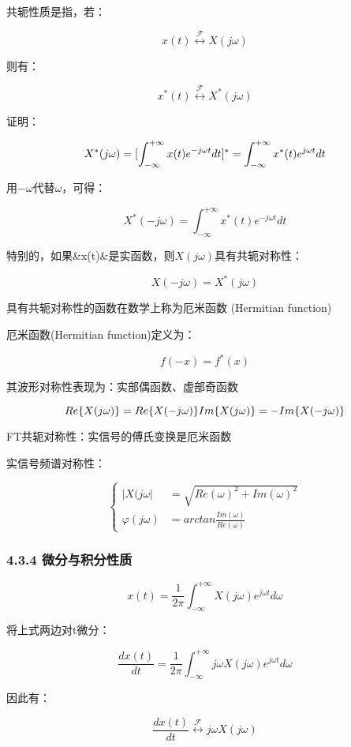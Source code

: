 \documentclass[
]{article}
\begin{document}
共轭性质是指，若：

\[x(t)\stackrel{\mathcal{F}}{\longleftrightarrow}X({j\omega})\]

则有：

\[x^*(t)\stackrel{\mathcal{F}}{\longleftrightarrow}X^*(j\omega)\]

证明：

\[X^*(j\omega) = [\int_{-\infty}^{+\infty}x(t)e^{-j\omega t}dt]^*\\
=\int_{-\infty}^{+\infty}x^*(t)e^{j\omega t}dt\]

用\(-\omega\)代替\(\omega\)，可得：

\[X^*(-j\omega)=\int_{{-\infty}}^{+\infty}x^*(t)e^{-j\omega t}dt\]

特别的，如果\&x(t)\&是实函数，则\(X(j\omega)\)具有共轭对称性：

\[X(-j\omega)=X^*(j\omega)\]

具有共轭对称性的函数在数学上称为厄米函数 (Hermitian function)

厄米函数(Hermitian function)定义为：

\[f(-x)=f^*(x)\]

其波形对称性表现为：实部偶函数、虚部奇函数

\[Re\{X(j\omega)\}=Re\{X(-j\omega)\}\\
Im\{X(j\omega)\}=-Im\{X(-j\omega)\}\]

FT共轭对称性：实信号的傅氏变换是厄米函数

实信号频谱对称性：

\[\left\{
\begin{aligned}
    |X(j\omega|&=\sqrt{Re(\omega)^2+Im(\omega)^2}\\
    \varphi(j\omega)&=arctan{\frac{Im(\omega)}{Re(\omega)}}
\end{aligned}
\right.\]

\subsubsection{4.3.4
微分与积分性质}\label{434-ux5faeux5206ux4e0eux79efux5206ux6027ux8d28}

\[x(t)=\frac{1}{2\pi}\int_{-\infty}^{+\infty}X(j\omega)e^{j\omega t}d\omega\]

将上式两边对t微分：

\[\frac{dx(t)}{dt}=\frac{1}{2\pi}\int_{-\infty}^{+\infty}j\omega X(j\omega)e^{j\omega t}d\omega\]

因此有：

\[\frac{dx(t)}{dt}\stackrel{\mathcal{F}}{\longleftrightarrow}j\omega X(j\omega)\]
\end{document}
